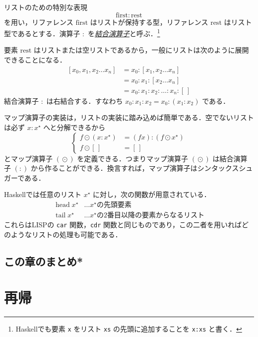 \documentclass[a4paper]{jsbook}
\newcommand{\programminglanguage}[1]{\textsf{#1}}
\newcommand{\haskell}{\programminglanguage{Haskell}}
\newcommand{\lisp}{\programminglanguage{LISP}}
\newcommand{\keyword}[1]{{\underline{\emph{#1}}}}
\newcommand{\code}[1]{\texttt{#1}}
\newcommand{\mSpecialVar}[1]{\mathrm{#1}} %
\newcommand{\mFirstVar}{\mSpecialVar{first}}
\newcommand{\mRestVar}{\mSpecialVar{rest}}
\newcommand{\mEmptyList}{{[\,]}}
\newcommand{\mListWith}[1]{\left[#1\right]}
\newcommand{\mList}[1]{{#1}^\mathrm{\star}}
\DeclareMathOperator{\mMapList}{\odot}
\DeclareMathOperator{\mHead}{head}
\DeclareMathOperator{\mTail}{tail}
\newcommand{\mathVarKeyword}[1]{\operatorname{\mathrm{#1}}}
\newcommand{\mFirstVar}{\mathVarKeyword{first}}
\begin{document}
リストのための特別な表現
\begin{equation}
\mFirstVar:\mRestVar
\end{equation}
を用い，リファレンス $\mFirstVar$ はリストが保持する型，リファレンス $\mRestVar$ はリスト型であるとする．演算子 $:$ を\keyword{結合演算子}と呼ぶ．\footnote{\haskell でも要素 \code{x} をリスト \code{xs} の先頭に追加することを \code{x:xs} と書く．}

要素 $\mRestVar$ はリストまたは空リストであるから，一般にリストは次のように展開できることになる．
\begin{align*}
\mListWith{x_0,x_1,x_2\dots x_n}
  &=x_0:\mListWith{x_1,x_2\dots x_n}\\
  &=x_0:x_1:\mListWith{x_2\dots x_n}\\
  &=x_0:x_1:x_2:\dots:x_n:\mEmptyList
\end{align*}
結合演算子 $:$ は右結合する．すなわち $x_0:x_1:x_2=x_0:(x_1:x_2)$ である．

マップ演算子の実装は，リストの実装に踏み込めば簡単である．空でないリストは必ず $x:\mList{x}$ へと分解できるから
\begin{equation}
\left\{
\begin{split}
f\mMapList{}(x:\mList{x})
  &=(fx):(f\mMapList\mList{x})\\
f\mMapList\mEmptyList
  &=\mEmptyList
\end{split}
\right.
\end{equation}
とマップ演算子 $(\mMapList)$ を定義できる．つまりマップ演算子 $(\mMapList)$ は結合演算子 $(:)$ から作ることができる．換言すれば，マップ演算子はシンタックスシュガーである．

\haskell では任意のリスト $\mList{x}$ に対し，次の関数が用意されている．
\begin{align*}
\mHead\mList{x}&\dots\text{$\mList{x}$の先頭要素}\\
\mTail\mList{x}&\dots\text{$\mList{x}$の2番目以降の要素からなるリスト}
\end{align*}
これらは\lisp  の \code{car} 関数，\code{cdr} 関数と同じものであり，この二者を用いればどのようなリストの処理も可能である．

\section*{この章のまとめ*}

\chapter{再帰}
\end{document}
